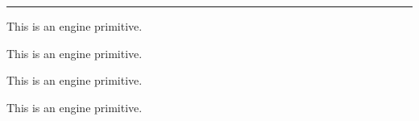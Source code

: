 \begin{function}[]
  {
    \hphantom
  }
  \begin{syntax}
  \end{syntax}

\end{function}



\begin{function}[]
  {
    \hrule
  }
  \begin{syntax}
  \end{syntax}
  This is an engine primitive.
\end{function}



\begin{function}[]
  {
    \hrulefill
  }
  \begin{syntax}
  \end{syntax}

\end{function}



\begin{function}[]
  {
    \hsize
  }
  \begin{syntax}
  \end{syntax}
  This is an engine primitive.
\end{function}






\begin{function}[]
  {
    \hss
  }
  \begin{syntax}
  \end{syntax}
  This is an engine primitive.
\end{function}



\begin{function}[]
  {
    \ht
  }
  \begin{syntax}
  \end{syntax}
  This is an engine primitive.
\end{function}



